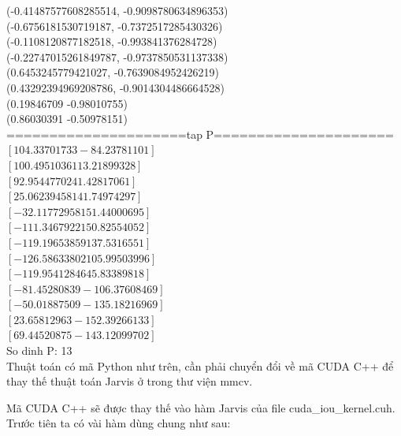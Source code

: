 \documentclass[12pt,a4paper,openany,oneside]{report}
\begin{document}
(-0.41487577608285514, -0.9098780634896353)\\
(-0.6756181530719187, -0.7372517285430326)\\
(-0.1108120877182518, -0.993841376284728)\\
(-0.22747015261849787, -0.9737850531137338)\\
(0.6453245779421027, -0.7639084952426219)\\
(0.43292394969208786, -0.9014304486664528)\\
(0.19846709 -0.98010755)\\
(0.86030391 -0.50978151)\\
=====================tap P=====================\\
$\left[104.33701733 -84.23781101\right]$\\
$\left[100.49510361  13.21899328\right]$\\
$\left[92.95447702 41.42817061\right]$\\
$\left[ 25.06239458 141.74974297\right]$\\
$\left[-32.11772958 151.44000695\right]$\\
$\left[-111.3467922   150.82554052\right]$\\
$\left[-119.19653859  137.5316551 \right]$\\
$\left[-126.58633802  105.99503996\right]$\\
$\left[-119.95412846   45.83389818\right]$\\
$\left[ -81.45280839 -106.37608469\right]$\\
$\left[ -50.01887509 -135.18216969\right]$\\
$\left[  23.65812963 -152.39266133\right]$\\
$\left[  69.44520875 -143.12099702\right]$\\
So dinh P:  13\\


Thuật toán có mã Python như trên, cần phải chuyển đổi về mã CUDA C++ để thay thế thuật toán Jarvis ở trong thư viện mmcv. 

Mã CUDA C++ sẽ được thay thế vào hàm Jarvis của file cuda\_iou\_kernel.cuh. Trước tiên ta có vài hàm dùng chung như sau:
\end{document}
